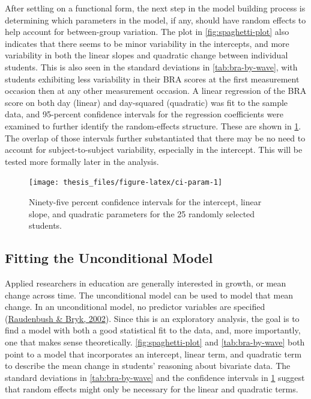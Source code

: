 \documentclass[11pt]{umnthesis}
\begin{document}
After settling on a functional form, the next step in the model building process is determining which parameters in the model, if any, should have random effects to help account for between-group variation. The plot in \ref{fig:spaghetti-plot} also indicates that there seems to be minor variability in the intercepts, and more variability in both the linear slopes and quadratic change between individual students. This is also seen in the standard deviations in \ref{tab:bra-by-wave}, with students exhibiting less variability in their BRA scores at the first measurement occasion then at any other measurement occasion. A linear regression of the BRA score on both day (linear) and day-squared (quadratic) was fit to the sample data, and 95-percent confidence intervals for the regression coefficients were examined to further identify the random-effects structure. These are shown in \ref{fig:ci-param}. The overlap of those intervals further substantiated that there may be no need to account for subject-to-subject variability, especially in the intercept. This will be tested more formally later in the analysis.

\begin{figure}[H]

{\centering \texttt{[image: thesis\_files/figure-latex/ci-param-1]} 

}

\caption[Ninety-five percent confidence intervals for the intercept, linear slope, and quadratic parameters for the 25 randomly selected students]{Ninety-five percent confidence intervals for the intercept, linear slope, and quadratic parameters for the 25 randomly selected students.}\label{fig:ci-param}
\end{figure}

\hypertarget{fitting-the-unconditional-model}{%
\subsection{Fitting the Unconditional Model}\label{fitting-the-unconditional-model}}

Applied researchers in education are generally interested in growth, or mean change across time. The unconditional model can be used to model that mean change. In an unconditional model, no predictor variables are specified (\protect\hyperlink{ref-raudenbush:2002}{Raudenbush \& Bryk, 2002}). Since this is an exploratory analysis, the goal is to find a model with both a good statistical fit to the data, and, more importantly, one that makes sense theoretically. \ref{fig:spaghetti-plot} and \ref{tab:bra-by-wave} both point to a model that incorporates an intercept, linear term, and quadratic term to describe the mean change in students' reasoning about bivariate data. The standard deviations in \ref{tab:bra-by-wave} and the confidence intervals in \ref{fig:ci-param} suggest that random effects might only be necessary for the linear and quadratic terms.
\end{document}
